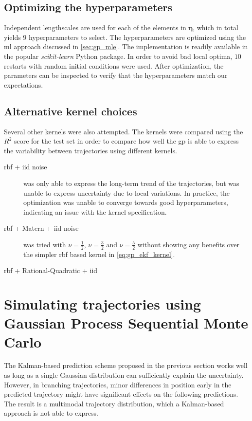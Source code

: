\subsection{Optimizing the hyperparameters}
Independent lengthscales are used for each of the elements in $\boldsymbol{\eta}$, which in total yields $9$ hyperparameters to select. The hyperparameters are optimized using the \acrshort{ml} approach discussed in \cref{sec:gp_mle}. The implementation is readily available in the popular \textit{scikit-learn} \cite{scikit-learn} Python package. In order to avoid bad local optima, $10$ restarts with random initial conditions were used. After optimization, the parameters can be inspected to verify that the hyperparameters match our expectations.

\subsection{Alternative kernel choices}
Several other kernels were also attempted. The kernels were compared using the $R^2$ score for the test set in order to compare how well the \acrshort{gp} is able to express the variability between trajectories using different kernels.

\begin{description}
    \item[\acrshort{rbf} + \acrshort{iid} noise] was only able to express the long-term trend of the trajectories, but was unable to express uncertainty due to local variations. In practice, the optimization was unable to converge towards good hyperparameters, indicating an issue with the kernel specification.
    \item[\acrshort{rbf} + Matern + \acrshort{iid} noise] was tried with $\nu=\frac{1}{2}$, $\nu=\frac{3}{2}$ and $\nu=\frac{5}{2}$ without showing any benefits over the simpler \acrshort{rbf} based kernel in \cref{eq:gp_ekf_kernel}.
    \item[\acrshort{rbf} + Rational-Quadratic + \acrshort{iid}]
\end{description}

\section{Simulating trajectories using Gaussian Process Sequential Monte Carlo}
The Kalman-based prediction scheme proposed in the previous section works well as long as a single Gaussian distribution can sufficiently explain the uncertainty. However, in branching trajectories, minor differences in position early in the predicted trajectory might have significant effects on the following predictions. The result is a multimodal trajectory distribution, which a Kalman-based approach is not able to express.

